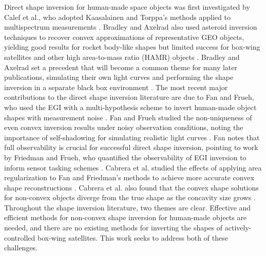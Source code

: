 Direct shape inversion for human-made space objects was first investigated by Calef et al., who adopted Kaasalainen and Torppa's methods applied to multispectrum measurements \cite{calef2006photometric}. Bradley and Axelrad also used asteroid inversion techniques to recover convex approximations of representative GEO objects, yielding good results for rocket body-like shapes but limited success for box-wing satellites and other high area-to-mass ratio (HAMR) objects \cite{bradley2014}. Bradley and Axelrad set a precedent that will become a common theme for many later publications, simulating their own light curves and performing the shape inversion in a separate black box environment \cite{bradley2014}. The most recent major contributions to the direct shape inversion literature are due to Fan and Frueh, who used the EGI with a multi-hypothesis scheme to invert human-made object shapes with measurement noise \cite{fan2019, fan2020thesis, fan2021}. Fan and Frueh studied the non-uniqueness of even convex inversion results under noisy observation conditions, noting the importance of self-shadowing for simulating realistic light curves \cite{fan2020thesis}. Fan notes that full observability is crucial for successful direct shape inversion, pointing to work by Friedman and Frueh, who quantified the observability of EGI inversion to inform sensor tasking schemes \cite{friedman2020, friedman2022}. Cabrera et al. studied the effects of applying area regularization to Fan and Friedman's methods to achieve more accurate convex shape reconstructions \cite{cabrera2021}. Cabrera et al. also found that the convex shape solutions for non-convex objects diverge from the true shape as the concavity size grows \cite{cabrera2021}. Throughout the shape inversion literature, two themes are clear. Effective and efficient methods for non-convex shape inversion for human-made objects are needed, and there are no existing methods for inverting the shapes of actively-controlled box-wing satellites. This work seeks to address both of these challenges.

